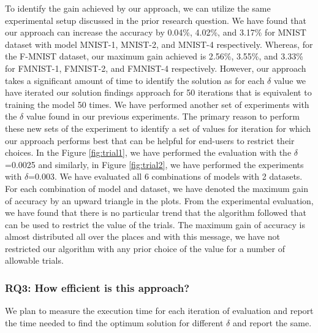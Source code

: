 To identify the gain achieved by our approach, we can utilize the same experimental setup discussed in the prior research question. We have found that our approach can increase the accuracy by 0.04\%, 4.02\%, and 3.17\% for MNIST dataset with model MNIST-1, MNIST-2, and MNIST-4 respectively. Whereas, for the F-MNIST dataset, our maximum gain achieved is 2.56\%, 3.55\%, and 3.33\% for FMNIST-1, FMNIST-2, and FMNIST-4 respectively. However, our approach takes a significant amount of time to identify the solution as for each $\delta$ value we have iterated our solution findings approach for 50 iterations that is equivalent to training the model 50 times. We have performed another set of experiments with the $\delta$ value found in our previous experiments. The primary reason to perform these new sets of the experiment to identify a set of values for iteration for which our approach performs best that can be helpful for end-users to restrict their choices. In the Figure \ref{fig:trial1}, we have performed the evaluation with the $\delta$=0.0025 and similarly, in Figure \ref{fig:trial2}, we have performed the experiments with $\delta$=0.003. We have evaluated all 6 combinations of models with 2 datasets. For each combination of model and dataset, we have denoted the maximum gain of accuracy by an upward triangle in the plots. From the experimental evaluation, we have found that there is no particular trend that the algorithm followed that can be used to restrict the value of the trials. The maximum gain of accuracy is almost distributed all over the places and with this message, we have not restricted our algorithm with any prior choice of the value for a number of allowable trials.

\subsubsection{\textbf{RQ3: How efficient is this approach?}}
We plan to measure the execution time for each iteration of evaluation and report the time needed to find the optimum solution for different $\delta$ and report the same.





